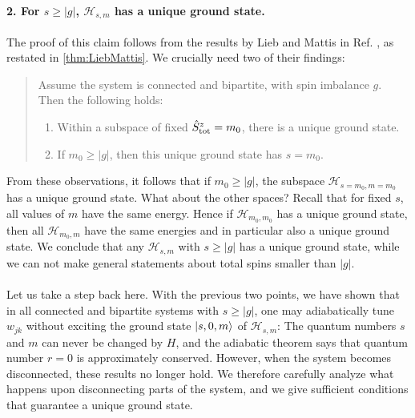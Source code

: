 \paragraph{2. For $s \geq |g|$, $\mathcal{H}_{s,m}$ has a unique ground state. }
The proof of this claim follows from the results by Lieb and Mattis in Ref. \cite{Lieb1962}, as restated in \cref{thm:LiebMattis}. We crucially need two of their  findings: 
%
\begin{quote}
Assume the system is connected and bipartite, with spin imbalance $g$. Then the following holds:
\begin{enumerate}
\item Within a subspace of fixed ${\hat{S}^z_\text{tot}} = m_0$, there is a unique ground state.
\item If $m_0 \geq |g|$, then this unique ground state has $s = m_0$.
\end{enumerate}
\end{quote}
%
From these observations, it follows that if $m_0 \geq |g|$, the subspace $\mathcal{H}_{{s=m_0},{m=m_0}}$ has a unique ground state. What about the other spaces? Recall that for fixed $s$, all values of $m$ have the same energy. Hence if $\mathcal{H}_{m_0,m_0}$ has a unique ground state, then all $\mathcal{H}_{m_0, m}$ have the same energies and in particular also a unique ground state. We conclude that any $\mathcal{H}_{s,m}$ with $s\geq |g|$ has a unique ground state, while we can not make general statements about total spins smaller than $|g|$. 

\paragraph{}
Let us take a step back here. With the previous two points, we have shown that in all connected and bipartite systems with $s\geq |g|$, one may adiabatically tune $w_{jk}$ without exciting the ground state $\lvert s,0,m\rangle$ of $\mathcal{H}_{s,m}$: The quantum numbers $s$ and $m$ can never be changed by $H$, and the adiabatic theorem says that quantum number $r=0$ is approximately conserved.  However, when the system becomes disconnected, these results no longer hold. We therefore carefully analyze what happens upon disconnecting parts of the system, and we give sufficient conditions that guarantee a unique ground state.

